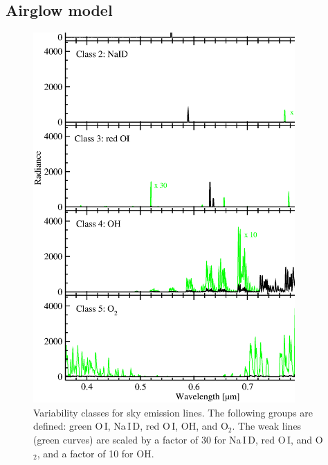 \subsection{Airglow model}\label{sec:airglow}
\begin{figure}
\centering
\includegraphics[width=10cm,clip=true]{figures/varclasses.eps}
\caption[]{Variability classes for sky emission lines. The following groups are
defined: green O\,I, Na\,I\,D, red O\,I, OH, and O$_2$. The weak lines (green
curves) are scaled by a factor of 30 for Na\,I\,D, red O\,I, and O$_2$, and a
factor of 10 for OH.}
\label{fig:varclasses}
\end{figure}

